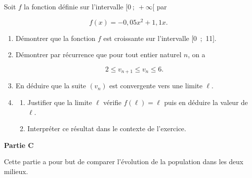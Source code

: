 Soit $f$ la fonction définie sur l'intervalle $[0~;~+\infty[$ par 

\[f(x) = -0,05x^2 + 1,1x.\]

\begin{enumerate}[resume]
\item Démontrer que la fonction $f$ est croissante sur l'intervalle [0~;~11].
\item Démontrer par récurrence que pour tout entier naturel $n$, on a 

\[2 \leqslant v_{n+1} \leqslant v_n \leqslant 6.\]

\item En déduire que la suite $(v_n)$ est convergente vers une limite $\ell$.
\item 
	\begin{enumerate}
		\item Justifier que la limite $\ell$ vérifie $f(\ell) = \ell$ puis en déduire la valeur de $\ell$.
		\item Interpréter ce résultat dans le contexte de l'exercice.
	\end{enumerate}
\end{enumerate}

\medskip

\textbf{Partie C}

Cette partie a pour but de comparer l'évolution de la population dans les deux milieux.

